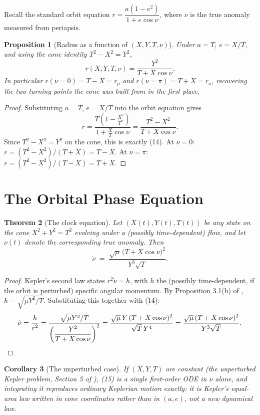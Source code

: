 \documentclass[12pt]{amsart}
\theoremstyle{plain}
\newtheorem{theorem}{Theorem}[section]
\newtheorem{proposition}[theorem]{Proposition}
\newtheorem{corollary}[theorem]{Corollary}
\theoremstyle{remark}
\begin{document}
Recall the standard orbit equation $r=\dfrac{a(1-e^2)}{1+e\cos\nu}$, where $\nu$ is the true anomaly measured from periapsis.

\begin{proposition}[Radius as a function of $(X,Y,T,\nu)$]
Under $a=T$, $e=X/T$, and using the cone identity $T^2-X^2=Y^2$,
\begin{equation}
r(X,Y,T,\nu)=\frac{Y^2}{T+X\cos\nu}. \tag{14}
\end{equation}
In particular $r(\nu=0)=T-X=r_p$ and $r(\nu=\pi)=T+X=r_a$, recovering the two turning points the cone was built from in the first place.
\end{proposition}

\begin{proof}
Substituting $a=T$, $e=X/T$ into the orbit equation gives
\[
r=\frac{T\left(1-\frac{X^2}{T^2}\right)}{1+\frac{X}{T}\cos\nu}=\frac{T^2-X^2}{T+X\cos\nu}.
\]
Since $T^2-X^2=Y^2$ on the cone, this is exactly (14). At $\nu=0$: $r=(T^2-X^2)/(T+X)=T-X$. At $\nu=\pi$: $r=(T^2-X^2)/(T-X)=T+X$.
\end{proof}

\section{The Orbital Phase Equation}

\begin{theorem}[The clock equation]
Let $(X(t),Y(t),T(t))$ be any state on the cone $X^2+Y^2=T^2$ evolving under a (possibly time-dependent) flow, and let $\nu(t)$ denote the corresponding true anomaly. Then
\begin{equation}
\dot\nu \;=\; \frac{\sqrt{\mu}\,\bigl(T+X\cos\nu\bigr)^{2}}{Y^{3}\sqrt{T}}. \tag{15}
\end{equation}
\end{theorem}

\begin{proof}
Kepler's second law states $r^2\dot\nu=h$, with $h$ the (possibly time-dependent, if the orbit is perturbed) specific angular momentum. By Proposition 3.1(b) of \cite{Ebert2026Cone}, $h=\sqrt{\mu Y^2/T}$. Substituting this together with (14):
\[
\dot\nu=\frac{h}{r^2}=\frac{\sqrt{\mu Y^2/T}}{\left(\dfrac{Y^2}{T+X\cos\nu}\right)^{2}}=\frac{\sqrt{\mu}\,Y\,(T+X\cos\nu)^2}{\sqrt{T}\,Y^4}=\frac{\sqrt{\mu}\,(T+X\cos\nu)^2}{Y^3\sqrt{T}}. \qedhere
\]
\end{proof}

\begin{corollary}[The unperturbed case]
If $(X,Y,T)$ are constant (the unperturbed Kepler problem, Section 5 of \cite{Ebert2026Cone}), (15) is a single first-order ODE in $\nu$ alone, and integrating it reproduces ordinary Keplerian motion exactly: it is Kepler's equal-area law written in cone coordinates rather than in $(a,e)$, not a new dynamical law.
\end{corollary}
\end{document}
